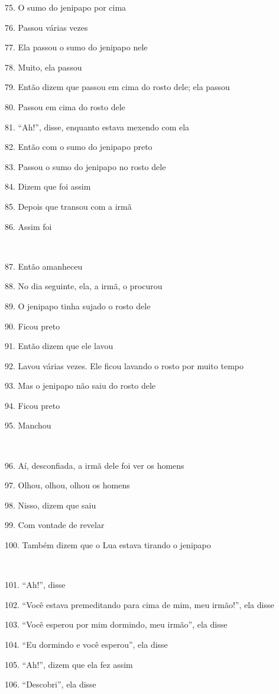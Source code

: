 75. O sumo do jenipapo por cima

76. Passou várias vezes

77. Ela passou o sumo do jenipapo nele

78. Muito, ela passou

79. Então dizem que passou em cima do rosto dele; ela passou

80. Passou em cima do rosto dele

81. ``Ah!'', disse, enquanto estava mexendo com ela

82. Então com o sumo do jenipapo preto

83. Passou o sumo do jenipapo no rosto dele

84. Dizem que foi assim

85. Depois que transou com a irmã

86. Assim foi

~

87. Então amanheceu

88. No dia seguinte, ela, a irmã, o procurou

89. O jenipapo tinha sujado o rosto dele

90. Ficou preto

91. Então dizem que ele lavou

92. Lavou várias vezes. Ele ficou lavando o rosto por muito tempo

93. Mas o jenipapo não saiu do rosto dele

94. Ficou preto

95. Manchou

~

96. Aí, desconfiada, a irmã dele foi ver os homens

97. Olhou, olhou, olhou os homens

98. Nisso, dizem que saiu

99. Com vontade de revelar

100. Também dizem que o Lua estava tirando o jenipapo

~

101. ``Ah!'', disse

102. ``Você estava premeditando para cima de mim, meu irmão!'', ela disse

103. ``Você esperou por mim dormindo, meu irmão'', ela disse

104. ``Eu dormindo e você esperou'', ela disse

105. ``Ah!'', dizem que ela fez assim

106. ``Descobri'', ela disse

